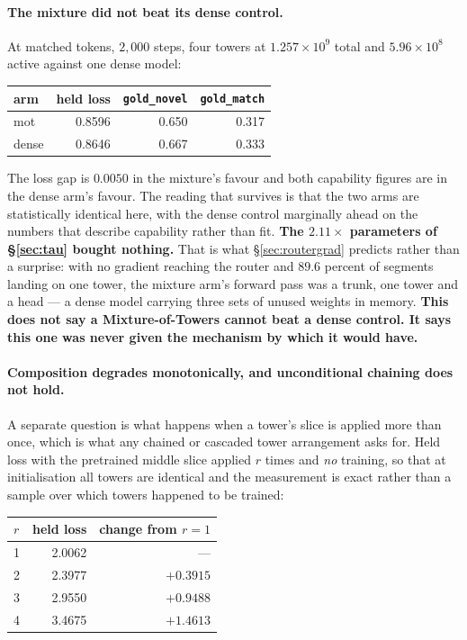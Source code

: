 \documentclass[11pt]{article}
\begin{document}
\paragraph{The mixture did not beat its dense control.} At matched tokens, $2{,}000$ steps, four towers at $1.257\times10^{9}$ total and $5.96\times10^{8}$ active against one dense model:

\begin{center}
\begin{tabular}{@{}lrrr@{}}
\toprule
arm & held loss & \texttt{gold\_novel} & \texttt{gold\_match} \\
\midrule
mot   & 0.8596 & 0.650 & 0.317 \\
dense & 0.8646 & 0.667 & 0.333 \\
\bottomrule
\end{tabular}
\end{center}

The loss gap is $0.0050$ in the mixture's favour and both capability figures are in the dense arm's favour. The reading that survives is that the two arms are statistically identical here, with the dense control marginally ahead on the numbers that describe capability rather than fit. \textbf{The $2.11\times$ parameters of \S\ref{sec:tau} bought nothing.} That is what \S\ref{sec:routergrad} predicts rather than a surprise: with no gradient reaching the router and $89.6$ percent of segments landing on one tower, the mixture arm's forward pass was a trunk, one tower and a head --- a dense model carrying three sets of unused weights in memory. \textbf{This does not say a Mixture-of-Towers cannot beat a dense control. It says this one was never given the mechanism by which it would have.}

\paragraph{Composition degrades monotonically, and unconditional chaining does not hold.} A separate question is what happens when a tower's slice is applied more than once, which is what any chained or cascaded tower arrangement asks for. Held loss with the pretrained middle slice applied $r$ times and \emph{no} training, so that at initialisation all towers are identical and the measurement is exact rather than a sample over which towers happened to be trained:

\begin{center}
\begin{tabular}{@{}lrr@{}}
\toprule
$r$ & held loss & change from $r=1$ \\
\midrule
1 & 2.0062 & --- \\
2 & 2.3977 & $+0.3915$ \\
3 & 2.9550 & $+0.9488$ \\
4 & 3.4675 & $+1.4613$ \\
\bottomrule
\end{tabular}
\end{center}
\end{document}
